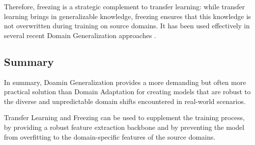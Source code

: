 Therefore, freezing is a strategic complement to transfer learning: while transfer learning brings in generalizable knowledge, freezing ensures that this knowledge is not overwritten during training on source domains. It has been used effectively in several recent Domain Generalization approaches \cite{zhouMixStyleNeuralNetworks2023}.

\subsection*{Summary}
In summary, Doamin Generalization provides a more demanding but often more practical solution than Domain Adaptation for creating models that are robust to the diverse and unpredictable domain shifts encountered in real-world scenarios.

Transfer Learning and Freezing can be used to supplement the training process, by providing a robust feature extraction backbone and by preventing the model from overfitting to the domain-specific features of the source domains.


\clearpage
